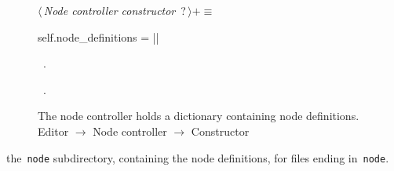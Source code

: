 \documentclass[%
    a4paper,    %
    justified,  %
    nobib,      %
    openany     %
]{tufte-book}
\makeatletter
\renewcommand{\label}[1]{\@tufte@label{##1}}%
\makeatother
\begin{document}
\begin{figure}
\begin{flushleft} \small
\begin{minipage}{\linewidth}\label{scrap122}\raggedright\small
{} $\langle\,${\itshape Node controller constructor}\nobreak\ {\footnotesize {?}}$\,\rangle+\equiv$
\vspace{-1ex}
\begin{pythoncode}
    self.node_definitions = {}
|\NWsep|
\end{pythoncode}
\vspace{1.5ex}
\footnotesize
\begin{list}{}{\setlength{\itemsep}{-\parsep}\setlength{\itemindent}{-\leftmargin}}
\item \NWtxtMacroDefBy\ .
\item \NWtxtMacroRefIn\ .

\item{}
\end{list}
\end{minipage}\vspace{4ex}
\end{flushleft}
\caption{The node controller holds a dictionary containing node definitions.
  \newline{}\newline{}Editor $\rightarrow$ Node controller $\rightarrow$
  Constructor}
\label{editor:lst:node-controller:constructor:node-definitions}
\end{figure}

 the~\verb=node= subdirectory, containing
the node definitions, for files ending in~\verb=node=.
\end{document}
